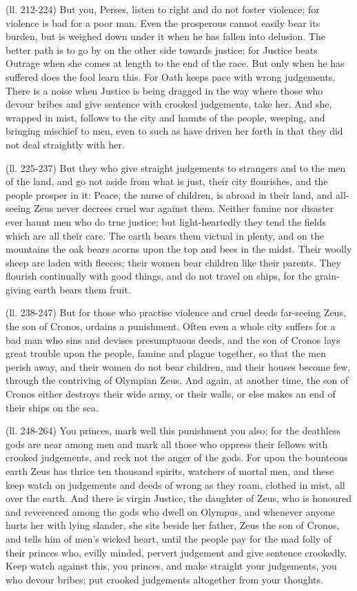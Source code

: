 (ll. 212-224) But you, Perses, listen to right and do not foster violence; for
violence is bad for a poor man. Even the prosperous cannot easily bear its
burden, but is weighed down under it when he has fallen into delusion. The
better path is to go by on the other side towards justice; for Justice beats
Outrage when she comes at length to the end of the race. But only when he has
suffered does the fool learn this. For Oath keeps pace with wrong judgements.
There is a noise when Justice is being dragged in the way where those who
devour bribes and give sentence with crooked judgements, take her. And she,
wrapped in mist, follows to the city and haunts of the people, weeping, and
bringing mischief to men, even to such as have driven her forth in that they
did not deal straightly with her.

(ll. 225-237) But they who give straight judgements to strangers and to the men
of the land, and go not aside from what is just, their city flourishes, and the
people prosper in it: Peace, the nurse of children, is abroad in their land,
and all-seeing Zeus never decrees cruel war against them. Neither famine nor
disaster ever haunt men who do true justice; but light-heartedly they tend the
fields which are all their care. The earth bears them victual in plenty, and on
the mountains the oak bears acorns upon the top and bees in the midst. Their
woolly sheep are laden with fleeces; their women bear children like their
parents. They flourish continually with good things, and do not travel on
ships, for the grain-giving earth bears them fruit.

(ll. 238-247) But for those who practise violence and cruel deeds far-seeing
Zeus, the son of Cronos, ordains a punishment. Often even a whole city suffers
for a bad man who sins and devises presumptuous deeds, and the son of Cronos
lays great trouble upon the people, famine and plague together, so that the men
perish away, and their women do not bear children, and their houses become few,
through the contriving of Olympian Zeus. And again, at another time, the son of
Cronos either destroys their wide army, or their walls, or else makes an end of
their ships on the sea.

(ll. 248-264) You princes, mark well this punishment you also; for the
deathless gods are near among men and mark all those who oppress their fellows
with crooked judgements, and reck not the anger of the gods. For upon the
bounteous earth Zeus has thrice ten thousand spirits, watchers of mortal men,
and these keep watch on judgements and deeds of wrong as they roam, clothed in
mist, all over the earth. And there is virgin Justice, the daughter of Zeus,
who is honoured and reverenced among the gods who dwell on Olympus, and
whenever anyone hurts her with lying slander, she sits beside her father, Zeus
the son of Cronos, and tells him of men’s wicked heart, until the people
pay for the mad folly of their princes who, evilly minded, pervert judgement
and give sentence crookedly. Keep watch against this, you princes, and make
straight your judgements, you who devour bribes; put crooked judgements
altogether from your thoughts.

